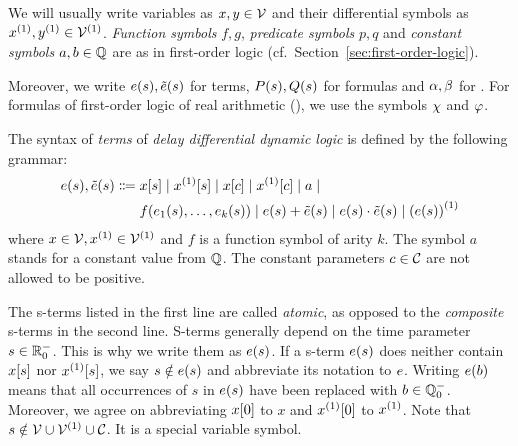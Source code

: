     We will usually write variables as $x,y\in\mathcal{V}$ and their differential symbols as $\D{x},\D{y}\in\diffvars$.
    \emph{Function symbols} $f,g$, \emph{predicate symbols} $p,q$ and \emph{constant symbols} $a,b\in\mathbb{Q}$ are as in first-order logic (cf.\ Section~\ref{sec:first-order-logic}).

    Moreover, we write $e(s),\tilde{e}(s)$ for \ddL terms, $P(s),Q(s)$ for \ddL formulas and $\alpha,\beta$ for \dHPs. For formulas of first-order logic of real arithmetic (\FOLR), we use the symbols $\chi$ and $\varphi$.

    \begin{definition}[s-Terms]\label{def:syntax-terms}
        The syntax of \emph{terms} of \emph{delay differential dynamic logic} is defined by the following grammar:
        \begin{align*}
            \astrm(s),\bstrm(s) \Coloneqq{}&
                \x[s] \mid
                \Dx[s] \mid
                \x[c] \mid
                \Dx[c] \mid
                a \mid\\
                & f(\range{\istrm{1}(s)}{\istrm{k}(s)}) \mid
                \astrm(s) + \bstrm(s) \mid
                \astrm(s) \cdot \bstrm(s) \mid
                \D{(\astrm(s))}
        \end{align*}
        where $x\in\allvars,\D{x}\in\diffvars$ and $f$ is a function symbol of arity $k$.
        The symbol $a$ stands for a constant value from $\mathbb{Q}$. The constant parameters $c\in\mathcal{C}_{}$ are not allowed to be positive.
    \end{definition}

    The s-terms listed in the first line are called \emph{atomic}, as opposed to the \emph{composite} s-terms in the second line.
    S-terms generally depend on the time parameter $s\in\mathbb{R}^-_0$. This is why we write them as $e(s)$.
    If a s-term $e(s)$ does neither contain $x[s]$ nor $\Dx[s]$, we say $s\notin e(s)$ and abbreviate its notation to $e$.
    Writing $e(b)$ means that all occurrences of $s$ in $e(s)$ have been replaced with $b\in\mathbb{Q}^-_0$.
    Moreover, we agree on abbreviating $x[0]$ to $x$ and $\Dx[0]$ to $\D{x}$.
    Note that $s\notin\allvars\cup\diffvars\cup\constants$. It is a special variable symbol.

